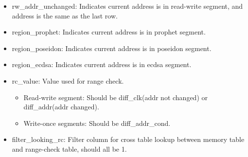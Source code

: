 \begin{itemize}
    \item rw\_addr\_unchanged: Indicates current address is in read-write segment, and address is the same as the last row.
    \item region\_prophet: Indicates current address is in prophet segment.
    \item region\_poseidon: Indicates current address is in poseidon segment.
    \item region\_ecdsa: Indicates current address is in ecdsa segment.
    \item rc\_value: Value used for range check.
          \begin{itemize}
              \item  Read-write segment: Should be diff\_clk(addr not changed) or diff\_addr(addr changed).
              \item Write-once segments: Should be diff\_addr\_cond.
          \end{itemize}
    \item filter\_looking\_rc: Filter column for cross table lookup between memory table and range-check table, should all be 1.
\end{itemize}